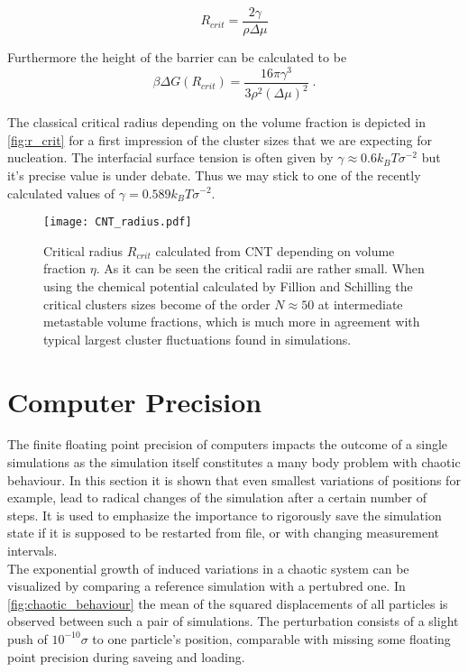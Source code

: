 \begin{equation}
\label{eqn:r_crit}
R_{crit} = \frac{2 \gamma}{\rho \Delta \mu }
\end{equation}

Furthermore the height of the barrier can be calculated to be 
\begin{equation}
\beta \Delta G (R_{crit}) = \frac{16 \pi \gamma^3}{3 \rho^2 (\Delta \mu )^2} \; \text{.}
\end{equation}

The classical critical radius depending on the volume fraction is depicted in \autoref{fig:r_crit} for a first impression of the cluster sizes that we are expecting for nucleation. The interfacial surface tension is often given by $\gamma \approx 0.6 k_B T \sigma^{-2}$ but it's precise value is under debate. Thus we may stick to one of the recently calculated values of $\gamma = 0.589 k_B T \sigma^{-2}$\cite{Bultmann2020}. 
\begin{figure}[h]
\centering
\texttt{[image: CNT\_radius.pdf]}
\caption[Critical radius in the metastable regime]{Critical radius $R_{crit}$ calculated from CNT depending on volume fraction $\eta$. As it can be seen the critical radii are rather small. When using the chemical potential calculated by Fillion and Schilling the critical clusters sizes become of the order $N \approx 50$ at intermediate metastable volume fractions, which is much more in agreement with typical largest cluster fluctuations found in simulations.}
\label{fig:r_crit}
\end{figure}

\section{Computer Precision}
\label{sec:precision}
The finite floating point precision of computers impacts the outcome of a single simulations as the simulation itself constitutes a many body problem with chaotic behaviour. In this section it is shown that even smallest variations of positions for example, lead to radical changes of the simulation after a certain number of steps. It is used to emphasize the importance to rigorously save the simulation state if it is supposed to be restarted from file, or with changing measurement intervals.\\

The exponential growth of induced variations in a chaotic system can be visualized by comparing a reference simulation with a pertubred one. In \autoref{fig:chaotic_behaviour} the mean of the squared displacements of all particles is observed between such a pair of simulations. The perturbation consists of a slight push of $10^{-10} \sigma$ to one particle's position, comparable with missing some floating point precision during saveing and loading.\\

